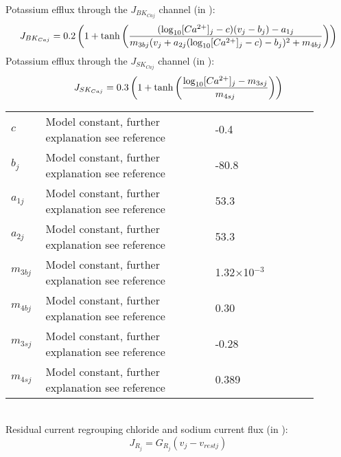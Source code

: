 \\
%
Potassium efflux through the $J_{BK_{Caj}}$ channel (in \uMs):
\begin{equation} \label{eq:JBKCAj}
J_{BK_{Caj}} = 0.2 \left(   1+ \mathrm{tanh}   \left(   \frac{   (\mathrm{log}_{10} [Ca^{2+}]_{j} - c) (v_{j}-b_{j}) - a_{1j}  }   { m_{3bj} ( v_{j} + a_{2j} (\mathrm{log}_{10} [Ca^{2+}]_{j} -c )-b_{j} )^{2} + m_{4bj} }  \right)     \right)  
\end{equation}
%
Potassium efflux through the $J_{SK_{Caj}}$ channel (in \uMs):
\begin{equation} \label{eq:JSKCaj}
J_{SK_{Caj}} = 0.3\left( 1+ \mathrm{tanh}  \left(  \frac{   \mathrm{log}_{10} [Ca^{2+}]_{j} -m_{3sj}  } {m_{4sj}}  \right)      \right) 
\end{equation}
%
\begin{table}[h!]
\centering
\begin{tabular}{ p{0.09\linewidth}  >{\footnotesize} p{0.5\linewidth}  >{\footnotesize} p{0.27\linewidth} >{\footnotesize} p{0.03\linewidth} }
\hline
$c$      				& Model constant, further explanation see reference					& -0.4 \uM			& \cite{Koenigsberger2006} \\
$b_{j}$      			& Model constant, further explanation see reference					& -80.8 \mV		& \cite{Koenigsberger2006} \\
$a_{1j}$      			& Model constant, further explanation see reference					& 53.3 \uMkeermV	& \cite{Koenigsberger2006} \\
$a_{2j}$      			& Model constant, further explanation see reference					& 53.3 \mVpuM		& \cite{Koenigsberger2006} \\
$m_{3bj}$      			& Model constant, further explanation see reference					& 1.32$\times$10$^{-3}$ \uMpmV	& \cite{Koenigsberger2006} \\
$m_{4bj}$      			& Model constant, further explanation see reference					& 0.30	\uMkeermV	& \cite{Koenigsberger2006} \\
$m_{3sj}$      			& Model constant, further explanation see reference					& -0.28 \uM		& \cite{Koenigsberger2006} \\
$m_{4sj}$      			& Model constant, further explanation see reference					& 0.389 \uM		& \cite{Koenigsberger2006} \\
\hline
\end{tabular}
\label{tab:JBKCAj}
\end{table}
\\
%
Residual current regrouping chloride and sodium current flux (in \uMs):
\begin{equation} \label{eq:JRj}
J_{R_{j}} = G_{R_{j}} ( v_{j} - v_{rest j}  )
\end{equation}
